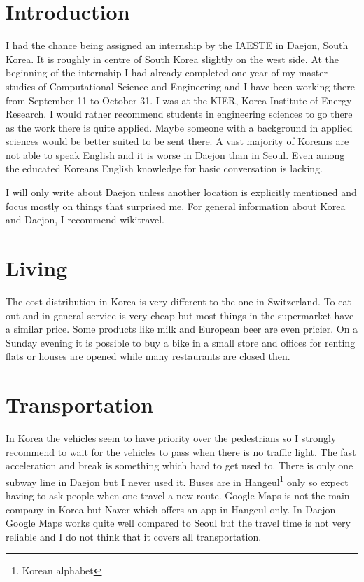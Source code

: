 \section*{Introduction}
I had the chance being assigned an internship by the IAESTE in Daejon, South Korea. It is roughly in centre of South Korea slightly on the west side. At the beginning of the internship I had already completed one year of my master studies of Computational Science and Engineering and I have been working there from September 11 to October 31. I was at the KIER, Korea Institute of Energy Research. I would rather recommend students in engineering sciences to go there as the work there is quite applied. Maybe someone with a background in applied sciences would be better suited to be sent there. A vast majority of Koreans are not able to speak English and it is worse in Daejon than in Seoul. Even among the educated Koreans English knowledge for basic conversation is lacking.

I will only write about Daejon unless another location is explicitly mentioned and focus mostly on things that surprised me. For general information about Korea and Daejon, I recommend wikitravel.
\section*{Living}
The cost distribution in Korea is very different to the one in Switzerland. To eat out and in general service is very cheap but most things in the supermarket have a similar price.  Some products like milk and European beer are even pricier. On a Sunday evening it is possible to buy a bike in a small store and offices for renting flats or houses are opened while many restaurants are closed then. 
\section*{Transportation}
In Korea the vehicles seem to have priority over the pedestrians so I strongly recommend to wait for the vehicles to pass when there is no traffic light. The fast acceleration and break is something which hard to get used to. There is only one subway line in Daejon but I never used it. Buses are in Hangeul\footnote{Korean alphabet} only so expect having to ask people when one travel a new route. Google Maps is not the main company in Korea but Naver which offers an app in Hangeul only. In Daejon Google Maps works quite well compared to Seoul but the travel time is not very reliable and I do not think that it covers all transportation.

